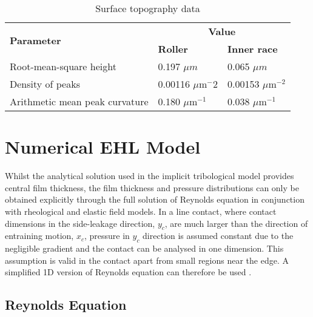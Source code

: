 \begin{table*}
	\caption{Surface topography data}
	\label{Surface Topography Data}
	\centering
	\renewcommand{\arraystretch}{1.5}%
	\begin{tabular}{|p{5.5cm}<{\centering}|p{3.5cm}<{\centering}|p{3.5cm}<{\centering}|}
		\hline 
		\multirow{2}{*}{\textbf{Parameter}} & \multicolumn{2}{|c|}{\textbf{Value}} \\ 
		\cline { 2 - 3 } 
		& \textbf{Roller} & \textbf{Inner race} \\
		\hline 
		Root-mean-square height & 0.197 $\mu m$ & 0.065 $\mu m$ \\
		\hline 
		Density of peaks& 0.00116 $\mu \mathrm{m}^-2$ & 0.00153 $\mu \mathrm{m}^{-2}$  \\
		\hline 
		Arithmetic mean peak curvature & 0.180 $\mu \mathrm{m}^{-1}$ & 0.038 $\mu \mathrm{m}^{-1}$ \\
		\hline 
	\end{tabular}
\end{table*}


\section{Numerical EHL Model}\label{1D EHL Model}

Whilst the analytical solution used in the implicit tribological model provides central film thickness, the film thickness and pressure distributions can only be obtained explicitly through the full solution of Reynolds equation in conjunction with rheological and elastic field models. In a line contact, where contact dimensions in the side-leakage direction, $y_c$, are much larger than the direction of entraining motion, $x_c$, pressure in $y_c$ direction is assumed constant due to the negligible gradient and the contact can be analysed in one dimension. This assumption is valid in the contact apart from small regions near the edge. A simplified 1D version of Reynolds equation can therefore be used \cite{Gupta1979}.

\subsection{Reynolds Equation}

